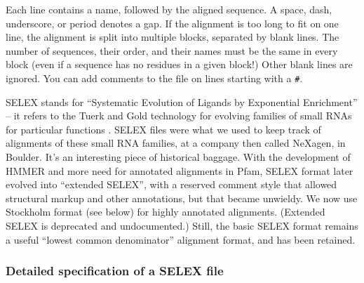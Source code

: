 Each line contains a name, followed by the aligned sequence. A space,
dash, underscore, or period denotes a gap. If the alignment is too
long to fit on one line, the alignment is split into multiple blocks,
separated by blank lines. The number of sequences, their order, and
their names must be the same in every block (even if a sequence has no
residues in a given block!) Other blank lines are ignored. You can add
comments to the file on lines starting with a \verb+#+.

SELEX stands for ``Systematic Evolution of Ligands by Exponential
Enrichment'' -- it refers to the Tuerk and Gold technology for
evolving families of small RNAs for particular functions
\cite{Tuerk90b}. SELEX files were what we used to keep track of
alignments of these small RNA families, at a company then called
NeXagen, in Boulder. It's an interesting piece of historical baggage.
With the development of HMMER and more need for annotated alignments
in Pfam, SELEX format later evolved into ``extended SELEX'', with a
reserved comment style that allowed structural markup and other
annotations, but that became unwieldy. We now use Stockholm format
(see below) for highly annotated alignments. (Extended SELEX is
deprecated and undocumented.) Still, the basic SELEX format remains a
useful ``lowest common denominator'' alignment format, and has been
retained.

\subsubsection {Detailed specification of a SELEX file}

